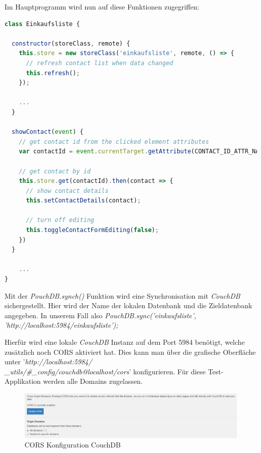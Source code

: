 Im Hauptprogramm wird nun auf diese Funktionen zugegriffen:

\begin{lstlisting}[language=JavaScript]
class Einkaufsliste {

  constructor(storeClass, remote) {
    this.store = new storeClass('einkaufsliste', remote, () => {
      // refresh contact list when data changed
      this.refresh();
    });

    ...
  }
  
  showContact(event) {
    // get contact id from the clicked element attributes
    var contactId = event.currentTarget.getAttribute(CONTACT_ID_ATTR_NAME);

    // get contact by id
    this.store.get(contactId).then(contact => {
      // show contact details
      this.setContactDetails(contact);

      // turn off editing
      this.toggleContactFormEditing(false);
    })
  }

    ...
}

\end{lstlisting}

Mit der \textit{PouchDB.synch()} Funktion wird eine Synchronisation mit \textit{CouchDB} sichergestellt. Hier wird der Name der lokalen Datenbank und die Zieldatenbank angegeben. In unserem Fall also \textit{PouchDB.sync('einkaufsliste', 'http://localhost:5984/einkaufsliste');}

Hierfür wird eine lokale \textit{CouchDB} Instanz auf dem Port 5984 benötigt, welche zusätzlich noch CORS\cite{cors} aktiviert hat. Dies kann man über die grafische Oberfläche unter '\textit{http://localhost:5984/\\\_utils/\#\_config/couchdb@localhost/cors}' konfigurieren. Für diese Test-Applikation werden alle Domains zugelassen. 

\begin{figure}[!h]
  \begin{center}
    \includegraphics[width=1\linewidth]{images/CORS.PNG}
     \caption{CORS Konfiguration CouchDB}
    \label{broker}
  \end{center}
\end{figure}


